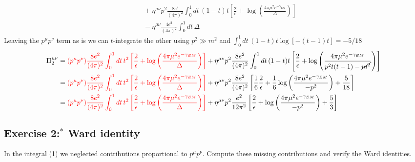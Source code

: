 \documentclass[10pt,a4paper]{article}
\theoremstyle{definition}
\begin{document}
\begin{enumerate}[1.]
\begin{enumerate}[1.)]
\begin{align}
&\quad+\eta^{\mu\nu}p^2\frac{8e^2}{(4\pi)^2}\int_0^1dt\,(1-t)t\left[\frac{2}{\epsilon}+\log\left(\frac{4\pi\mu^2e^{-\gamma_{EM}}}{\Delta}\right)\right]\\
&\quad-\eta^{\mu\nu}\frac{4e^2}{(4\pi)^2}\int_0^1dt\,\Delta
\end{align}
Leaving the $p^\mu p^\nu$ term as is we can $t$-integrate the other using $p^2\gg m^2$ and $\int_0^1dt\,(1-t)t \log[-(t-1)t]=-5/18$
\begin{align}
\Pi_2^{\mu\nu}
&=\textcolor{red}{(p^\mu p^\nu)\frac{8e^2}{(4\pi)^2}\int_0^1dt\,t^2\left[\frac{2}{\epsilon }+\log\left(\frac{4\pi\mu^2e^{-\gamma_{EM}}}{\Delta}\right)\right]}
+\eta^{\mu\nu}p^2\frac{8e^2}{(4\pi)^2}\int_0^1dt\,(1-t)t\left[\frac{2}{\epsilon}+\log\left(\frac{4\pi\mu^2e^{-\gamma_{EM}}}{p^2t(t-1)-\cancel{m^2}}\right)\right]\\
&=\textcolor{red}{(p^\mu p^\nu)\frac{8e^2}{(4\pi)^2}\int_0^1dt\,t^2\left[\frac{2}{\epsilon }+\log\left(\frac{4\pi\mu^2e^{-\gamma_{EM}}}{\Delta}\right)\right]}
+\eta^{\mu\nu}p^2\frac{8e^2}{(4\pi)^2}\left[\frac{1}{6}\frac{2}{\epsilon}+\frac{1}{6}\log\left(\frac{4\pi\mu^2e^{-\gamma_{EM}}}{-p^2}\right)+\frac{5}{18}\right]\\
&=\textcolor{red}{(p^\mu p^\nu)\frac{8e^2}{(4\pi)^2}\int_0^1dt\,t^2\left[\frac{2}{\epsilon }+\log\left(\frac{4\pi\mu^2e^{-\gamma_{EM}}}{\Delta}\right)\right]}
+\eta^{\mu\nu}p^2\frac{e^2}{12\pi^2}\left[\frac{2}{\epsilon}+\log\left(\frac{4\pi\mu^2e^{-\gamma_{EM}}}{-p^2}\right)+\frac{5}{3}\right]
\end{align}
\end{enumerate}

\end{enumerate}



\subsection{Exercise 2:$^*$ Ward identity}
{\color{blue} In the integral (1) we neglected contributions proportional to $p^\mu p^\nu$. Compute these missing contributions and verify the Ward identities.}
\end{document}
